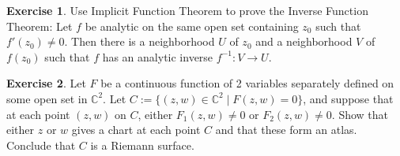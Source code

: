 \documentclass[12pt]{article}
\newcommand{\cx}{\mathbb{C}}
\newcommand\inv[1]{#1^{-1}}
\theoremstyle{definition}
\newtheorem{exercise}{Exercise}
\theoremstyle{remark}
\begin{document}
\begin{exercise}
    Use Implicit Function Theorem to prove the Inverse Function Theorem: Let $f$ be analytic on the same open set containing $z_0$ such that $f'(z_0)\neq0$. Then there is a neighborhood $U$ of $z_0$ and a neighborhood $V$ of $f(z_0)$ such that $f$ has an analytic inverse $\inv{f}:V\to U$.
\end{exercise}
\begin{exercise}
    Let $F$ be a continuous function of 2 variables separately defined on some open set in $\cx^2$. Let $C:=\{(z,w)\in\cx^2\mid F(z,w)=0\}$, and suppose that at each point $(z,w)$ on $C$, either $F_1(z,w)\neq0$ or $F_2(z,w)\neq0$. Show that either $z$ or $w$ gives a chart at each point $C$ and that these form an atlas. Conclude that $C$ is a Riemann surface.
\end{exercise}
\end{document}
